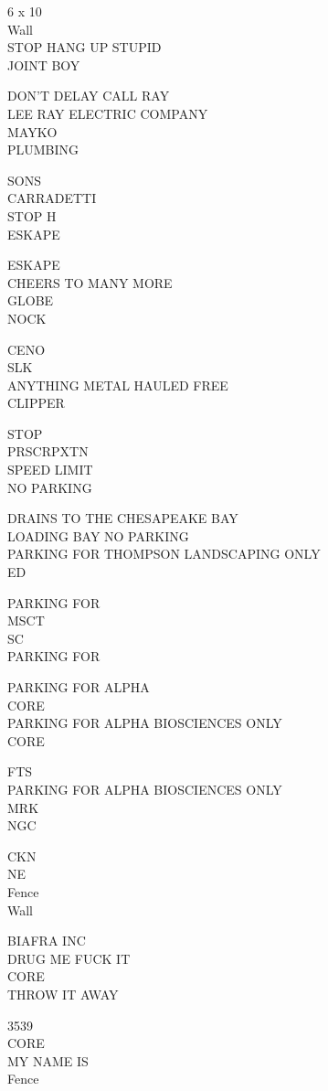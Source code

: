\documentclass[10pt,letterpaper]{article}
\begin{document}
6 x 10\\
Wall\\
STOP HANG UP STUPID\\
JOINT BOY

DON'T DELAY CALL RAY\\
LEE RAY ELECTRIC COMPANY\\
MAYKO\\
PLUMBING

SONS\\
CARRADETTI\\
STOP H\\
ESKAPE

ESKAPE\\
CHEERS TO MANY MORE\\
GLOBE\\
NOCK

CENO\\
SLK\\
ANYTHING METAL HAULED FREE\\
CLIPPER

STOP\\
PRSCRPXTN\\
SPEED LIMIT\\
NO PARKING

DRAINS TO THE CHESAPEAKE BAY\\
LOADING BAY NO PARKING\\
PARKING FOR THOMPSON LANDSCAPING ONLY\\
ED

PARKING FOR\\
MSCT\\
SC\\
PARKING FOR

PARKING FOR ALPHA\\
CORE\\
PARKING FOR ALPHA BIOSCIENCES ONLY\\
CORE

FTS\\
PARKING FOR ALPHA BIOSCIENCES ONLY\\
MRK\\
NGC

CKN\\
NE\\
Fence\\
Wall

BIAFRA INC\\
DRUG ME FUCK IT\\
CORE\\
THROW IT AWAY

3539\\
CORE\\
MY NAME IS\\
Fence
\end{document}
